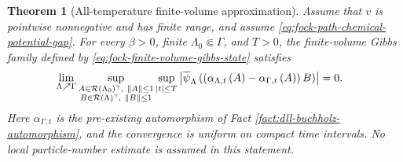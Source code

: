 \documentclass[11pt,a4paper]{article}
\theoremstyle{plain}
\newtheorem{thm}{Theorem}[section]
\theoremstyle{definition}
\theoremstyle{remark}
\begin{document}
\begin{thm}[All-temperature finite-volume approximation]\label{thm:fock-all-temperature-local-approximation}
Assume that $v$ is pointwise nonnegative and has finite range, and assume
\eqref{eq:fock-path-chemical-potential-gap}.
For every $\beta > 0$, finite $\Lambda_0 \Subset \Gamma$, and $T > 0$, the finite-volume Gibbs family defined by
\eqref{eq:fock-finite-volume-gibbs-state} satisfies
\begin{equation}
\begin{aligned}
\lim_{\Lambda \nearrow \Gamma}
\sup_{\substack{A \in \fun{\oaresolventalgebra}{\Lambda_0}^{\gamma},\ \norm{A} \leq 1\\
B \in \fun{\oaresolventalgebra}{\Lambda}^{\gamma},\ \norm{B} \leq 1}}
\sup_{\abs{t} \leq T}
\abs{
\fun{\oastate[\overline{\psi}_{\Lambda}]}{
\rbk{\fun{\alpha_{\Lambda,t}}{A} - \fun{\alpha_{\Gamma,t}}{A}} B}}
& =
0.
\end{aligned}
\label{eq:fock-all-temperature-thermodynamic-limit}
\end{equation}
Here $\alpha_{\Gamma,t}$ is the pre-existing automorphism of
Fact \ref{fact:dll-buchholz-automorphism}, and the convergence is uniform on compact time intervals.
No local particle-number estimate is assumed in this statement.
\end{thm}
\end{document}
